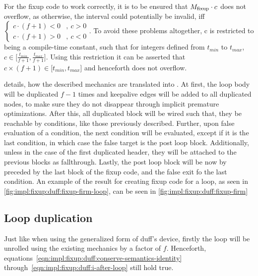 

For the fixup code to work correctly, it is to be ensured that $M_{\text{fixup}} \cdot c$ does not overflow, as otherwise, the interval \cinterval could potentially be invalid, iff $
\begin{cases}
    c \cdot (f + 1) < 0 &, \medspace c > 0\\
    c \cdot (f + 1) > 0 &, \medspace c < 0
\end{cases}$.
To avoid these problems altogether, c is restricted to being a compile-time constant, such that for integers defined from $t_{min}$ to $t_{max}$, $c \in \lbrack \frac{t_{min}}{f + 1}, \frac{t_{max}}{f + 1} \rbrack$.
Using this restriction it can be asserted that $c \times (f + 1) \in \lbrack t_{min}, t_{max} \rbrack$ and henceforth does not overflow.

 details, how the described mechanics are translated into \libFIRM.
At first, the loop body will be duplicated $f - 1$ times and keepalive edges will be added to all duplicated nodes, to make sure they do not disappear through implicit premature optimizations.
After this, all duplicated block will be wired such that, they be reachable by conditions, like those previously described.
Further, upon false evaluation of a condition, the next condition will be evaluated, except if it is the last condition, in which case the false target is the post loop block.
Additionally, unless in the case of the first duplicated header, they will be attached to the previous blocks as fallthrough.
Lastly, the post loop block will be now by preceded by the last block of the fixup code, and the false exit fo the last condition.
An example of the result for creating fixup code for a loop, as seen in \cref{fig:impl:fixup:duff:fixup-firm-loop}, can be seen in \cref{fig:impl:fixup:duff:fixup-firm}







\subsection{Loop duplication}\label{sec:impl:fixup:loop}

Just like when using the generalized form of duff's device, firstly the loop will be unrolled using the existing mechanics by a factor of $f$.
Henceforth, equations~\ref{eqn:impl:fixup:duff:conserve-semantics-identity} through~\ref{eqn:impl:fixup:duff:i-after-loop} still hold true.

